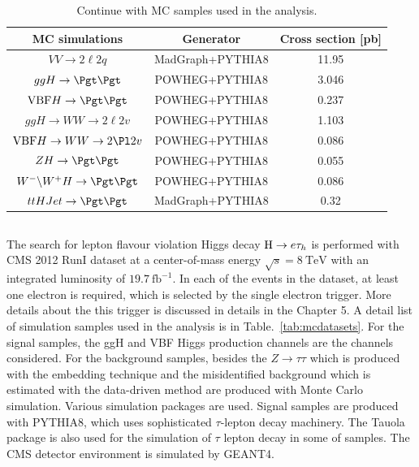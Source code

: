\begin{table}[!hbpt]
\caption{Continue with MC samples used in the analysis.}
\begin{center}
\begin{tabular}{|c|c|c|}
\hline
MC simulations & Generator & Cross section [pb] \\\hline
$VV \to2\ell 2 q$                                        &  MadGraph+PYTHIA8   &  11.95  \\\hline
$ggH\to \Pgt\Pgt $                                      & POWHEG+PYTHIA8 &      3.046\\\hline
$\textrm{VBF}H\to \Pgt\Pgt $                     & POWHEG+PYTHIA8 &      0.237\\\hline
$ggH\to WW \to 2\ell 2v$                            & POWHEG+PYTHIA8 &      1.103\\\hline
$\textrm{VBF}H\to WW\to 2\Pl 2v$             & POWHEG+PYTHIA8 &    0.086\\\hline
$ZH \to \Pgt\Pgt$                                        & POWHEG+PYTHIA8 &    0.055\\\hline  
$W^{-}\backslash W^{+} H\to\Pgt\Pgt$        & POWHEG+PYTHIA8 &    0.086\\\hline 
$ttHJet \to \Pgt\Pgt$                                   &MadGraph+PYTHIA8&     0.32\\\hline   
\end{tabular}
\end{center}
\label{tab:mutaumcsamples2}
\end{table}


\subsection{\Hehad}

The search for lepton flavour violation Higgs decay $\mathrm{H} \to e \tau_{h}$  is performed with CMS 2012 RunI dataset at a center-of-mass energy  $\sqrt{s}=8 ~\textrm{TeV}$ with an integrated luminosity of $19.7 ~\textrm{fb}^{-1}$. In each of the events in the dataset, at least one electron is required, which is selected by the single electron trigger. More details about the this trigger is discussed in details in the Chapter 5. A detail list of simulation samples used in the analysis is in Table.~\ref{tab:mcdatasets}.  For the signal samples, the ggH and VBF Higgs production channels are the channels considered. For the background samples, besides the $Z\to \tau \tau$ which is produced with the embedding technique and the misidentified background which is estimated with the data-driven method are produced with Monte Carlo simulation. Various simulation packages are used. Signal samples are produced with PYTHIA8, which uses sophisticated $\tau$-lepton decay machinery. The Tauola~\cite{Simulation:Tauola} package is also used for the simulation of $\tau$ lepton decay in some of samples. The CMS detector environment is simulated by GEANT4. 


